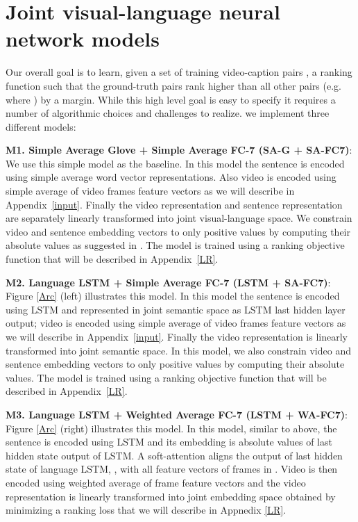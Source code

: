 \documentclass[runningheads]{llncs}
\begin{document}
\section{ Joint visual-language neural network models}
\label{2stream}

Our overall goal is to learn, given a set of training video-caption pairs , a ranking function such that the ground-truth pairs  rank higher than all other pairs (e.g.  where ) by a margin. While this high level goal is easy to specify it requires a number of algorithmic choices and challenges to realize. we implement three different models: 

\noindent
\textbf{M1. Simple Average Glove + Simple Average FC-7 (SA-G + SA-FC7)}:  We use this simple model as the baseline. In this model the sentence is encoded using simple average word vector representations. Also video is encoded using simple average of video frames feature vectors as we will describe in Appendix~\ref{input}. Finally the video representation and sentence representation are separately linearly transformed into joint visual-language space. We constrain video and sentence embedding vectors to only positive values by computing their absolute values as suggested in \cite{IvanVendrov2015}. The model is trained using a ranking objective function that will be described in Appendix~\ref{LR}.

\noindent
\textbf{M2. Language LSTM + Simple Average FC-7 (LSTM + SA-FC7)}:
Figure \ref{Arc} (left) illustrates this model. In this model the sentence is encoded using LSTM \cite{Graves13} and represented in joint semantic space as LSTM last hidden layer output; video is encoded using simple average of video frames feature vectors as we will describe in Appendix~\ref{input}. Finally the video representation is linearly transformed into joint semantic space. In this model, we also constrain video and sentence embedding vectors to only positive values by computing their absolute values. The model is trained using a ranking objective function that will be described in Appendix~\ref{LR}.

\noindent
\textbf{M3. Language LSTM + Weighted Average FC-7 (LSTM + WA-FC7)}: Figure \ref{Arc} (right) illustrates this model. In this model, similar to above, the sentence is encoded using LSTM and its embedding is absolute values of last hidden state output of LSTM. A soft-attention aligns the output of last hidden state of language LSTM, , with all feature vectors of frames in . Video is then encoded using weighted average of frame feature vectors and the video representation is linearly transformed into joint embedding space obtained by minimizing a ranking loss that we will describe in Appnedix \ref{LR}.
\end{document}
